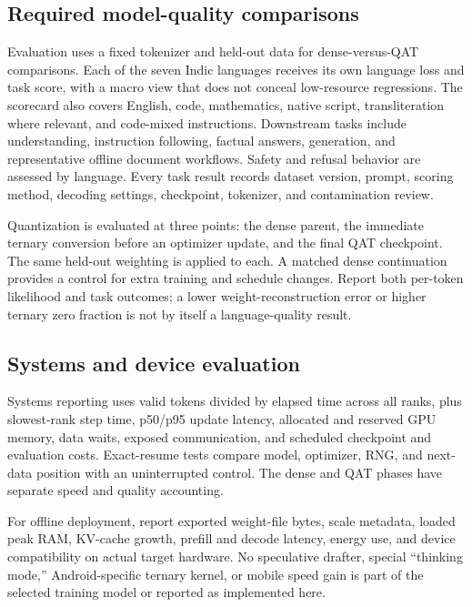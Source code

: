 \documentclass[11pt]{article}
\begin{document}
\subsection{Required model-quality comparisons}

Evaluation uses a fixed tokenizer and held-out data for dense-versus-QAT
comparisons. Each of the seven Indic languages receives its own language
loss and task score, with a macro view that does not conceal low-resource
regressions. The scorecard also covers English, code, mathematics, native
script, transliteration where relevant, and code-mixed instructions.
Downstream tasks include understanding, instruction following, factual
answers, generation, and representative offline document workflows. Safety
and refusal behavior are assessed by language. Every task result records
dataset version, prompt, scoring method, decoding settings, checkpoint,
tokenizer, and contamination review.

Quantization is evaluated at three points: the dense parent, the immediate
ternary conversion before an optimizer update, and the final QAT checkpoint.
The same held-out weighting is applied to each. A matched dense continuation
provides a control for extra training and schedule changes. Report both
per-token likelihood and task outcomes; a lower weight-reconstruction error
or higher ternary zero fraction is not by itself a language-quality result.

\subsection{Systems and device evaluation}

Systems reporting uses valid tokens divided by elapsed time across all
ranks, plus slowest-rank step time, p50/p95 update latency, allocated and
reserved GPU memory, data waits, exposed communication, and scheduled
checkpoint and evaluation costs. Exact-resume tests compare model,
optimizer, RNG, and next-data position with an uninterrupted control.
The dense and QAT phases have separate speed and quality accounting.

For offline deployment, report exported weight-file bytes, scale metadata,
loaded peak RAM, KV-cache growth, prefill and decode latency, energy use,
and device compatibility on actual target hardware. No speculative drafter,
special ``thinking mode,'' Android-specific ternary kernel, or mobile speed
gain is part of the selected training model or reported as implemented here.
\end{document}
